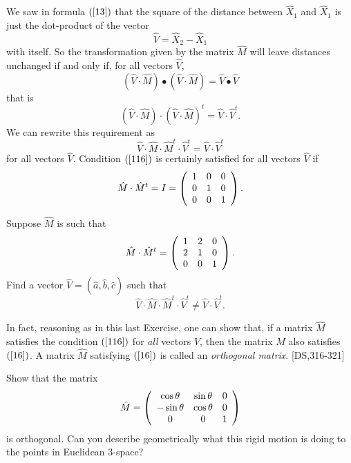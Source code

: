 \documentclass{ximera}
\begin{document}
We saw in formula $\left(  \ref{13}\right)  $ that the square of the distance
between $\hat{X}_{1}$ and $\hat{X}_{1}$ is just the dot-product of the vector%
\[
\hat{V}=\hat{X}_{2}-\hat{X}_{1}%
\]
with itself. So the transformation given by the matrix $\hat{M}$ will leave
distances unchanged if and only if, for all vectors $\hat{V}$,%
\[
\left(  \hat{V}  \cdot\hat{M}\right)  \bullet\left(
\hat{V}  \cdot\hat{M}\right)  =\hat{V}\bullet\hat{V}%
\]
that is%
\[
\left( \hat{V}  \cdot\hat{M}\right)  \cdot\left(
\hat{V}  \cdot\hat{M}\right)  ^{t}=\hat{V}  \cdot
\hat{V}  ^{t}.
\]
We can rewrite this requirement as%
\begin{equation}
\hat{V}  \cdot\hat{M}\cdot\hat{M}^{t}\cdot  \hat
{V}  ^{t}=\hat{V}  \cdot\hat{V}  ^{t}
\label{116}%
\end{equation}
for all vectors $\hat{V}$. Condition $\left(  \ref{116}\right)  $ is certainly
satisfied for all vectors $\hat{V}$ if
\begin{equation}
\hat{M}\cdot\hat{M}^{t}=I=\left(
\begin{array}
[c]{ccc}%
1 & 0 & 0\\
0 & 1 & 0\\
0 & 0 & 1
\end{array}
\right)  . \label{16}%
\end{equation}


\begin{exercise}
Suppose $\hat{M}$ is such that%
\[
\hat{M}\cdot\hat{M}^{t}=\left(
\begin{array}
[c]{ccc}%
1 & 2 & 0\\
2 & 1 & 0\\
0 & 0 & 1
\end{array}
\right)  .
\]
Find a vector $\hat{V}=\left(  \hat{a},\hat{b},\hat{c}\right)  $ such that%
\[
\hat{V} \cdot\hat{M}\cdot\hat{M}^{t}\cdot\hat{V}  ^{t}\neq\hat{V}  \cdot\hat{V}
^{t}.
\]

\end{exercise}

In fact, reasoning as in this last Exercise, one can show that, if a matrix
$\hat{M}$ satisfies the condition $\left(  \ref{116}\right)  $ for
\textit{all} vectors $\hat{V}$, then the matrix $\hat{M}$ also satisfies
$\left(  \ref{16}\right)  $. A matrix $\hat{M}$ satisfying $\left(
\ref{16}\right)  $ is called an \textit{orthogonal matrix}. [DS,316-321]

\begin{exercise}
\label{14} Show that the matrix%
\[
\hat{M}=\left(
\begin{array}
[c]{ccc}%
\cos\theta & \sin\theta & 0\\
-\sin\theta & \cos\theta & 0\\
0 & 0 & 1
\end{array}
\right)
\]
is orthogonal. Can you describe geometrically what this rigid motion is doing
to the points in Euclidean $3$-space?
\end{exercise}
\end{document}
